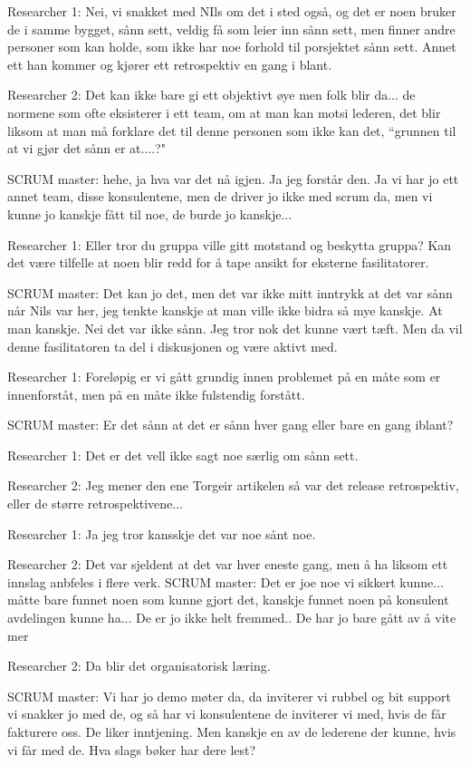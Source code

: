 \documentclass[12pt, a4paper]{report}
\begin{document}
Researcher 1: Nei, vi snakket med NIls om det i sted også, og det er noen bruker de i samme bygget, sånn sett, veldig få som leier inn sånn sett, men finner andre personer som kan holde, som ikke har noe forhold til porsjektet sånn sett. Annet ett han kommer og kjører ett retrospektiv en gang i blant.

Researcher 2: Det kan ikke bare gi ett objektivt øye men folk blir da... de normene som ofte eksisterer i ett team, om at man kan motsi lederen, det blir liksom at man må forklare det til denne personen som ikke kan det, ``grunnen til at vi gjør det sånn er at....?"

SCRUM master: hehe, ja hva var det nå igjen. Ja jeg forstår den. Ja vi har jo ett annet team, disse konsulentene, men de driver jo ikke med scrum da, men vi kunne jo kanskje fått til noe, de burde jo kanskje...

Researcher 1: Eller tror du gruppa ville gitt motstand og beskytta gruppa? Kan det være tilfelle at noen blir redd for å tape ansikt for eksterne fasilitatorer.

SCRUM master: Det kan jo det, men det var ikke mitt inntrykk at det var sånn når Nils var her, jeg tenkte kanskje at man ville ikke bidra så mye kanskje. At man kanskje. Nei det var ikke sånn. Jeg tror nok det kunne vært tæft. Men da vil denne fasilitatoren ta del i diskusjonen og være aktivt med. 

Researcher 1: Foreløpig er vi gått grundig innen problemet på en måte som er innenforståt, men på en måte ikke fulstendig forstått.

SCRUM master: Er det sånn at det er sånn hver gang eller bare en gang iblant?

Researcher 1: Det er det vell ikke sagt noe særlig om sånn sett.

Researcher 2: Jeg mener den ene Torgeir artikelen så var det release retrospektiv, eller de større retrospektivene...

Researcher 1: Ja jeg tror kansskje det var noe sånt noe.

Researcher 2: Det var sjeldent at det var hver eneste gang, men å ha liksom ett innslag anbfeles i flere verk.
SCRUM master: Det er joe noe vi sikkert kunne... måtte bare funnet noen som kunne gjort det, kanskje funnet noen på konsulent avdelingen kunne ha... De er jo ikke helt fremmed.. De har jo bare gått av å vite mer

Researcher 2: Da blir det organisatorisk læring.

SCRUM master: Vi har jo demo møter da, da inviterer vi rubbel og bit support vi snakker jo med de, og så har vi konsulentene de inviterer vi med, hvis de får fakturere oss. De liker inntjening. Men kanskje en av de lederene der kunne, hvis vi får med de. Hva slags bøker har dere lest?
\end{document}
